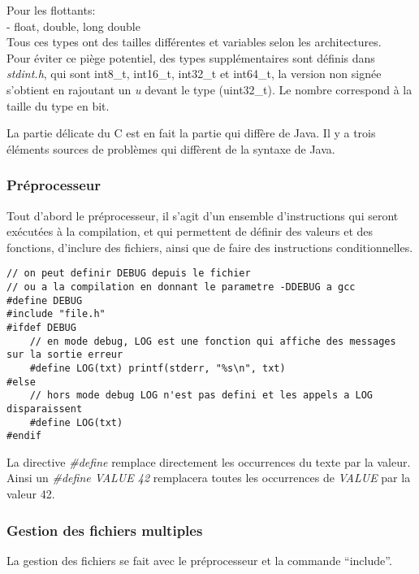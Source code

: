 \documentclass[a4paper,10pt]{article} %
\begin{document}
Pour les flottants:\\
- float, double, long double\\

Tous ces types ont des tailles différentes et variables selon les architectures.\\

Pour éviter ce piège potentiel, des types supplémentaires sont définis dans \textit{stdint.h}, qui sont int8\_t, int16\_t, int32\_t et int64\_t, la version non signée s'obtient en rajoutant un \textit{u} devant le type (uint32\_t). Le nombre correspond à la taille du type en bit.\\

\bigskip

La partie délicate du C est en fait la partie qui diffère de Java. Il y a trois éléments sources de problèmes qui diffèrent de la syntaxe de Java.

\subsubsection{Préprocesseur}
Tout d'abord le préprocesseur, il s'agit d'un ensemble d'instructions qui seront exécutées à la compilation, et qui permettent de définir des valeurs et des fonctions, d'inclure des fichiers, ainsi que de faire des instructions conditionnelles.\\

\begin{lstlisting}[frame=single]
// on peut definir DEBUG depuis le fichier
// ou a la compilation en donnant le parametre -DDEBUG a gcc
#define DEBUG
#include "file.h"
#ifdef DEBUG
    // en mode debug, LOG est une fonction qui affiche des messages sur la sortie erreur
    #define LOG(txt) printf(stderr, "%s\n", txt)
#else
    // hors mode debug LOG n'est pas defini et les appels a LOG disparaissent
    #define LOG(txt)
#endif
\end{lstlisting}

La directive \textit{\#define} remplace directement les occurrences du texte par la valeur. Ainsi un \textit{\#define VALUE 42} remplacera toutes les occurrences de \textit{VALUE} par la valeur 42.

\subsubsection{Gestion des fichiers multiples}
La gestion des fichiers se fait avec le préprocesseur et la commande ``include''.\\
\end{document}
